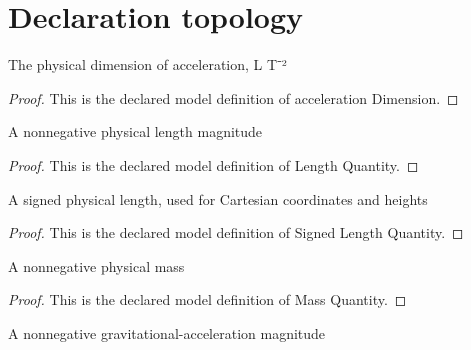 \section{Declaration topology}
\begin{definition}
  \label{def:physics:phyx-mini-0699:phyxminiproblems-problemphyxmini0699-accelerationdimension}
  The physical dimension of acceleration, L T⁻²
\end{definition}
\begin{proof}
  This is the declared model definition of acceleration Dimension.
\end{proof}
\begin{definition}
  \label{def:physics:phyx-mini-0699:phyxminiproblems-problemphyxmini0699-lengthquantity}
  A nonnegative physical length magnitude
\end{definition}
\begin{proof}
  This is the declared model definition of Length Quantity.
\end{proof}
\begin{definition}
  \label{def:physics:phyx-mini-0699:phyxminiproblems-problemphyxmini0699-signedlengthquantity}
  A signed physical length, used for Cartesian coordinates and heights
\end{definition}
\begin{proof}
  This is the declared model definition of Signed Length Quantity.
\end{proof}
\begin{definition}
  \label{def:physics:phyx-mini-0699:phyxminiproblems-problemphyxmini0699-massquantity}
  A nonnegative physical mass
\end{definition}
\begin{proof}
  This is the declared model definition of Mass Quantity.
\end{proof}
\begin{definition}
  \label{def:physics:phyx-mini-0699:phyxminiproblems-problemphyxmini0699-accelerationquantity}
  A nonnegative gravitational-acceleration magnitude
\end{definition}
